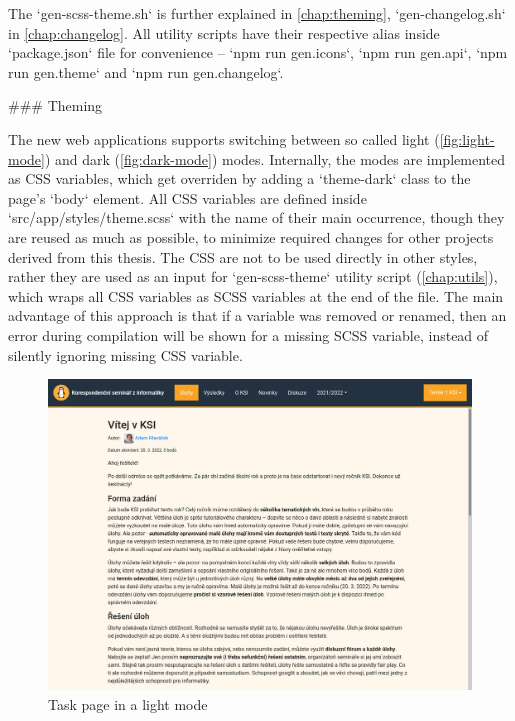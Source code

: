 \documentclass[
  digital, %
  oneside, %
  lof,     %
  lot,     %
]{fithesis4}
\begin{document}
{The `gen-scss-theme.sh` is further explained in \autoref{chap:theming}, `gen-changelog.sh` in \autoref{chap:changelog}. All utility scripts have their respective alias inside `package.json` file for convenience -- `npm run gen.icons`, `npm run gen.api`, `npm run gen.theme` and `npm run gen.changelog`. 

### Theming
\label{chap:theming}

The new web applications supports switching between so called light (\autoref{fig:light-mode}) and dark (\autoref{fig:dark-mode}) modes. Internally, the modes are implemented as CSS variables, which get overriden by adding a `theme-dark` class to the page's `body` element. All CSS variables are defined inside `src/app/styles/theme.scss` with the name of their main occurrence, though they are reused as much as possible, to minimize required changes for other projects derived from this thesis. The CSS are not to be used directly in other styles, rather they are used as an input for `gen-scss-theme` utility script (\autoref{chap:utils}), which wraps all CSS variables as SCSS variables at the end of the file. The main advantage of this approach is that if a variable was removed or renamed, then an error during compilation will be shown for a missing SCSS variable, instead of silently ignoring missing CSS variable.

\begin{figure}
\includegraphics[width=.8\textwidth]{assets/img/light-mode}
\caption{Task page in a light mode}
\label{fig:light-mode}
\end{figure}

}
\end{document}
